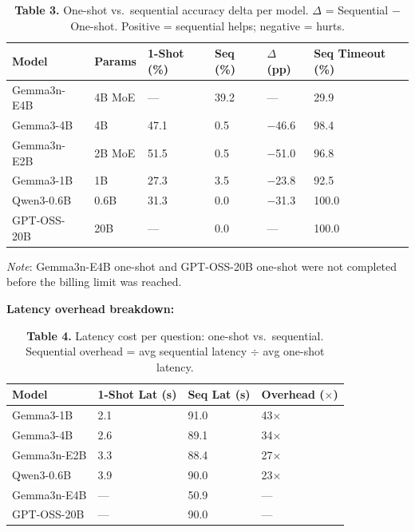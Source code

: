 \documentclass[11pt,letterpaper]{article}
\begin{document}
\vspace{0.2cm}

\begin{table}[h!]
\centering
\caption*{\textbf{Table 3.} One-shot vs.\ sequential accuracy delta per model.
  $\Delta$ = Sequential $-$ One-shot. Positive = sequential helps; negative = hurts.}
\begin{tabular}{l C{0.8cm} R{1.4cm} R{1.4cm} R{1.4cm} R{2.5cm}}
\toprule
\textbf{Model} & \textbf{Params} & \textbf{1-Shot (\%)} & \textbf{Seq (\%)} & \textbf{$\Delta$ (pp)} & \textbf{Seq Timeout (\%)} \\
\midrule
{} Gemma3n-E4B  & 4B MoE & ---  & 39.2 & --- & 29.9 \\
 Gemma3-4B    & 4B     & 47.1 &  0.5 & $-$46.6 & 98.4 \\
 Gemma3n-E2B  & 2B MoE & 51.5 &  0.5 & $-$51.0 & 96.8 \\
 Gemma3-1B    & 1B     & 27.3 &  3.5 & $-$23.8 & 92.5 \\
 Qwen3-0.6B   & 0.6B   & 31.3 &  0.0 & $-$31.3 & 100.0 \\
 GPT-OSS-20B  & 20B    & ---  &  0.0 & --- & 100.0 \\
\bottomrule
\end{tabular}
\end{table}

\noindent\textit{Note}: Gemma3n-E4B one-shot and GPT-OSS-20B one-shot were not completed before the
billing limit was reached.

\vspace{0.4cm}

\noindent\textbf{Latency overhead breakdown:}

\begin{table}[h!]
\centering
\caption*{\textbf{Table 4.} Latency cost per question: one-shot vs.\ sequential. Sequential
  overhead = avg sequential latency $\div$ avg one-shot latency.}
\begin{tabular}{l R{2.0cm} R{2.0cm} R{2.0cm}}
\toprule
\textbf{Model} & \textbf{1-Shot Lat (s)} & \textbf{Seq Lat (s)} & \textbf{Overhead ($\times$)} \\
\midrule
Gemma3-1B   &  2.1 & 91.0 & 43$\times$ \\
Gemma3-4B   &  2.6 & 89.1 & 34$\times$ \\
Gemma3n-E2B &  3.3 & 88.4 & 27$\times$ \\
Qwen3-0.6B  &  3.9 & 90.0 & 23$\times$ \\
Gemma3n-E4B &  ---  & 50.9 & --- \\
GPT-OSS-20B &  ---  & 90.0 & --- \\
\bottomrule
\end{tabular}
\end{table}
\end{document}
